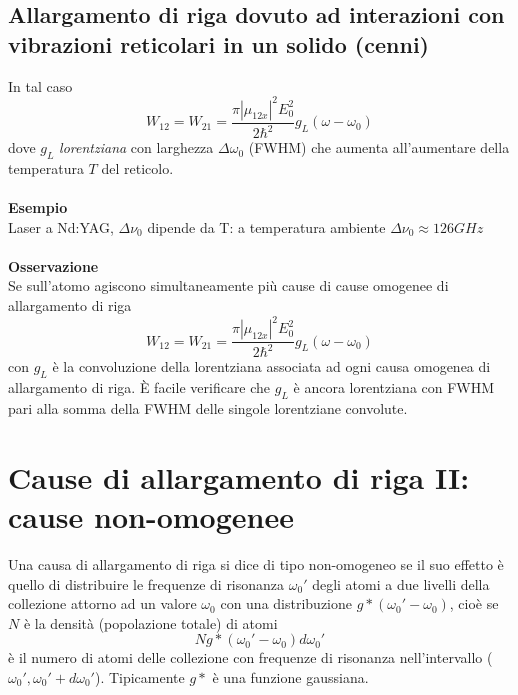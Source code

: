 \subsection{Allargamento di riga dovuto ad interazioni con vibrazioni reticolari in un solido (cenni)}
In tal caso 
\begin{equation*}
W_{12} = W_{21} = \frac{\pi|\mu_{12x}|^2 E_0^2}{2\hbar^2} g_L(\omega - \omega_0)
\end{equation*}
dove $g_L$ \textit{lorentziana} con larghezza $\Delta \omega_0$ (FWHM) che aumenta all'aumentare della temperatura $T$ del reticolo.\\
\\
\textbf{Esempio}\\
Laser a Nd:YAG, $\Delta \nu_0$ dipende da T:
a temperatura ambiente $\Delta \nu_0 \approx 126 GHz$\\
\\
\textbf{Osservazione}\\
Se sull'atomo agiscono simultaneamente più cause di cause omogenee di allargamento di riga
\begin{equation*}
W_{12} = W_{21} = \frac{\pi|\mu_{12x}|^2 E_0^2}{2\hbar^2} g_L(\omega - \omega_0)
\end{equation*}
con $g_L$ è la convoluzione della lorentziana associata ad ogni causa omogenea di allargamento di riga. È facile verificare che $g_L$ è ancora lorentziana con FWHM pari alla somma della FWHM delle singole lorentziane convolute.\\

\section{Cause di allargamento di riga II: cause non-omogenee}
Una causa di allargamento di riga si dice di tipo non-omogeneo se il suo effetto è quello di distribuire le frequenze di risonanza $\omega_0'$ degli atomi a due livelli della collezione attorno ad un valore $\omega_0$ con una distribuzione $g*(\omega_0' - \omega_0)$, cioè se $N$ è la densità (popolazione totale) di atomi
\begin{equation*}
Ng*(\omega_0' - \omega_0) d\omega_0'
\end{equation*}
è il numero di atomi delle collezione con frequenze di risonanza nell'intervallo ($\omega_0', \omega_0' + d\omega_0'$).
Tipicamente $g*$ è una funzione gaussiana.

